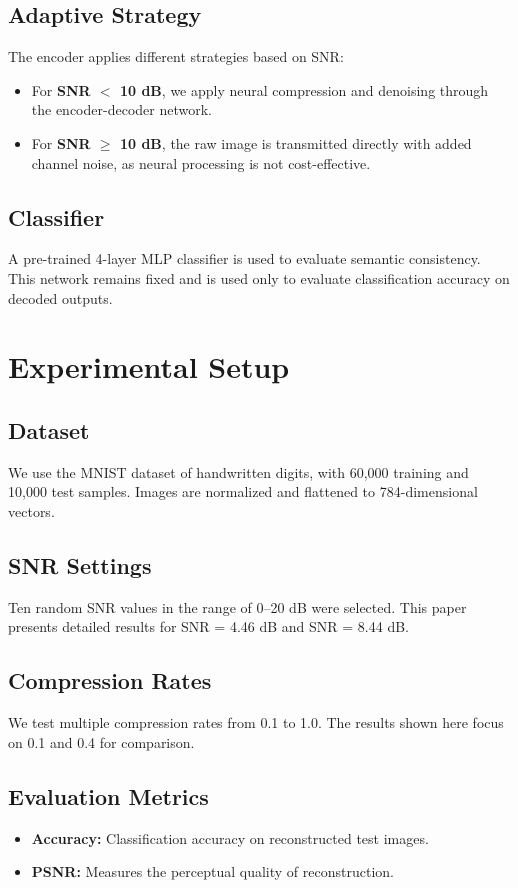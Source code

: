 \documentclass[conference]{IEEEtran}
\begin{document}
\subsection{Adaptive Strategy}
The encoder applies different strategies based on SNR:
\begin{itemize}
    \item For \textbf{SNR $<$ 10 dB}, we apply neural compression and denoising through the encoder-decoder network.
    \item For \textbf{SNR $\geq$ 10 dB}, the raw image is transmitted directly with added channel noise, as neural processing is not cost-effective.
\end{itemize}

\subsection{Classifier}
A pre-trained 4-layer MLP classifier is used to evaluate semantic consistency. This network remains fixed and is used only to evaluate classification accuracy on decoded outputs.

\section{Experimental Setup}

\subsection{Dataset}
We use the MNIST dataset of handwritten digits, with 60,000 training and 10,000 test samples. Images are normalized and flattened to 784-dimensional vectors.

\subsection{SNR Settings}
Ten random SNR values in the range of 0–20 dB were selected. This paper presents detailed results for SNR = 4.46 dB and SNR = 8.44 dB.

\subsection{Compression Rates}
We test multiple compression rates from 0.1 to 1.0. The results shown here focus on 0.1 and 0.4 for comparison.

\subsection{Evaluation Metrics}
\begin{itemize}
    \item \textbf{Accuracy:} Classification accuracy on reconstructed test images.
    \item \textbf{PSNR:} Measures the perceptual quality of reconstruction.
\end{itemize}
\end{document}

